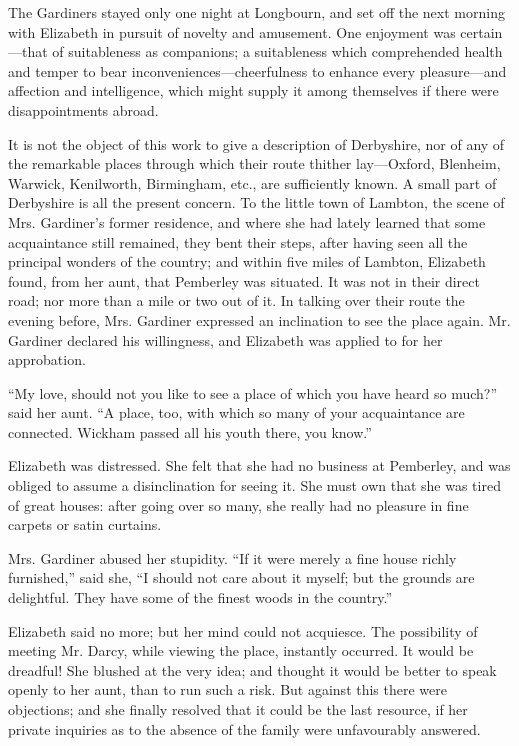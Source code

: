 The Gardiners stayed only one night at Longbourn, and set off the next morning with Elizabeth in pursuit of novelty and amusement. One enjoyment was certain---that of suitableness as companions; a suitableness which comprehended health and temper to bear inconveniences---cheerfulness to enhance every pleasure---and affection and intelligence, which might supply it among themselves if there were disappointments abroad.

It is not the object of this work to give a description of Derbyshire, nor of any of the remarkable places through which their route thither lay---Oxford, Blenheim, Warwick, Kenilworth, Birmingham, etc., are sufficiently known. A small part of Derbyshire is all the present concern. To the little town of Lambton, the scene of Mrs. Gardiner's former residence, and where she had lately learned that some acquaintance still remained, they bent their steps, after having seen all the principal wonders of the country; and within five miles of Lambton, Elizabeth found, from her aunt, that Pemberley was situated. It was not in their direct road; nor more than a mile or two out of it. In talking over their route the evening before, Mrs. Gardiner expressed an inclination to see the place again. Mr. Gardiner declared his willingness, and Elizabeth was applied to for her approbation.

``My love, should not you like to see a place of which you have heard so much?'' said her aunt. ``A place, too, with which so many of your acquaintance are connected. Wickham passed all his youth there, you know.''

Elizabeth was distressed. She felt that she had no business at Pemberley, and was obliged to assume a disinclination for seeing it. She must own that she was tired of great houses: after going over so many, she really had no pleasure in fine carpets or satin curtains.

Mrs. Gardiner abused her stupidity. ``If it were merely a fine house richly furnished,'' said she, ``I should not care about it myself; but the grounds are delightful. They have some of the finest woods in the country.''

Elizabeth said no more; but her mind could not acquiesce. The possibility of meeting Mr. Darcy, while viewing the place, instantly occurred. It would be dreadful! She blushed at the very idea; and thought it would be better to speak openly to her aunt, than to run such a risk. But against this there were objections; and she finally resolved that it could be the last resource, if her private inquiries as to the absence of the family were unfavourably answered.

